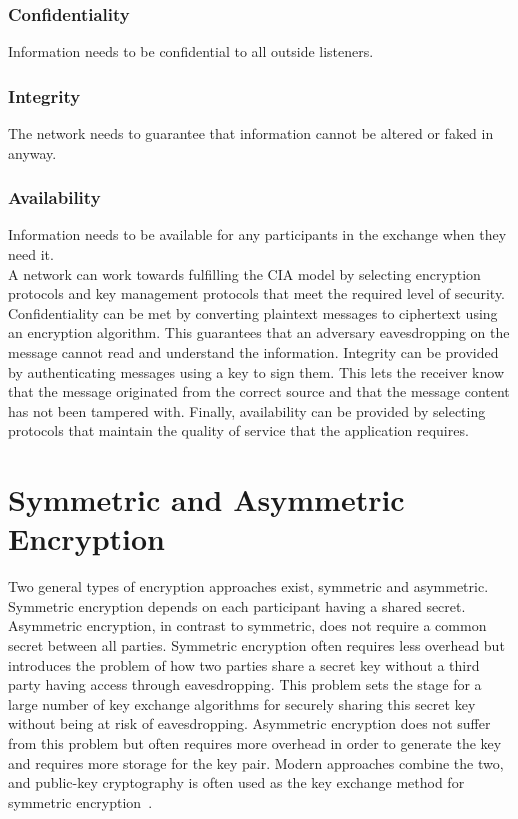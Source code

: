 \documentclass[journal]{IEEEtran}
\begin{document}
\subsubsection{Confidentiality}
Information needs to be confidential to all outside listeners.
\subsubsection{Integrity}
The network needs to guarantee that information cannot be altered or faked in anyway.
\subsubsection{Availability}
Information needs to be available for any participants in the exchange when they need it.
\\
A network can work towards fulfilling the CIA model by selecting encryption protocols and key management protocols that meet the required level of security. Confidentiality can be met by converting plaintext messages to ciphertext using an encryption algorithm. This guarantees that an adversary eavesdropping on the message cannot read and understand the information. Integrity can be provided by authenticating messages using a key to sign them. This lets the receiver know that the message originated from the correct source and that the message content has not been tampered with. Finally, availability can be provided by selecting protocols that maintain the quality of service that the application requires.

\section{Symmetric and Asymmetric Encryption}
Two general types of encryption approaches exist, symmetric and asymmetric. Symmetric encryption depends on each participant having a shared secret. Asymmetric encryption, in contrast to symmetric, does not require a common secret between all parties. Symmetric encryption often requires less overhead but introduces the problem of how two parties share a secret key without a third party having access through eavesdropping. This problem sets the stage for a large number of key exchange algorithms for securely sharing this secret key without being at risk of eavesdropping. Asymmetric encryption does not suffer from this problem but often requires more overhead in order to generate the key and requires more storage for the key pair. Modern approaches combine the two, and public-key cryptography is often used as the key exchange method for symmetric encryption~\cite{PK1}.
\end{document}
